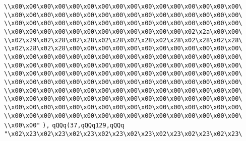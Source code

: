 \verb|\\x00\x00\x00\x00\x00\x00\x00\x00\x00\x00\x00\x00\x00\x00\x00\x00\|\newline
\verb|\\x00\x00\x00\x00\x00\x00\x00\x00\x00\x00\x00\x00\x00\x00\x00\x00\|\newline
\verb|\\x00\x00\x00\x00\x00\x00\x00\x00\x00\x00\x00\x00\x00\x00\x00\x00\|\newline
\verb|\\x00\x00\x00\x00\x00\x00\x00\x00\x00\x00\x00\x00\x02\x2a\x00\x00\|\newline
\verb|\\x02\x29\x02\x28\x02\x28\x02\x28\x02\x28\x02\x28\x02\x28\x02\x28\|\newline
\verb|\\x02\x28\x02\x28\x00\x00\x00\x00\x00\x00\x00\x00\x00\x00\x00\x00\|\newline
\verb|\\x00\x00\x00\x00\x00\x00\x00\x00\x00\x00\x00\x00\x00\x00\x00\x00\|\newline
\verb|\\x00\x00\x00\x00\x00\x00\x00\x00\x00\x00\x00\x00\x00\x00\x00\x00\|\newline
\verb|\\x00\x00\x00\x00\x00\x00\x00\x00\x00\x00\x00\x00\x00\x00\x00\x00\|\newline
\verb|\\x00\x00\x00\x00\x00\x00\x00\x00\x00\x00\x00\x00\x00\x00\x00\x00\|\newline
\verb|\\x00\x00\x00\x00\x00\x00\x00\x00\x00\x00\x00\x00\x00\x00\x00\x00\|\newline
\verb|\\x00\x00\x00\x00\x00\x00\x00\x00\x00\x00\x00\x00\x00\x00\x00\x00\|\newline
\verb|\\x00\x00\x00\x00\x00\x00\x00\x00\x00\x00\x00\x00\x00\x00\x00\x00\|\newline
\verb|\\x00\x00\x00\x00\x00\x00\x00\x00\x00\x00\x00\x00\x00\x00\x00\x00\|\newline
\verb|\\x00\x00"|\newline
\verb|),|\newline
\verb|qQQq(37,qQQq129,qQQq|\newline
\verb|"\x02\x23\x02\x23\x02\x23\x02\x23\x02\x23\x02\x23\x02\x23\x02\x23\|\newline
